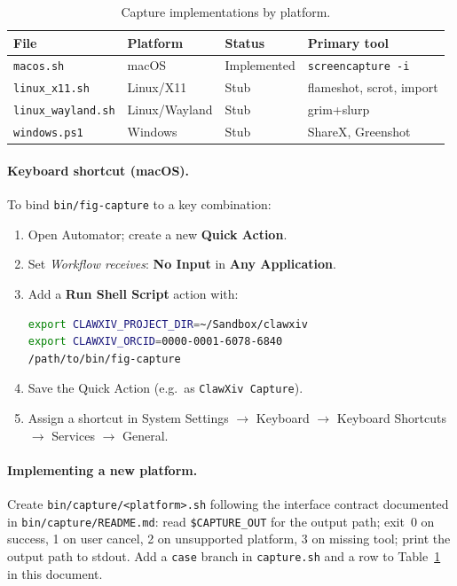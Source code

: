 \documentclass[11pt]{article}
\begin{document}
\begin{table}[h]
\centering
\begin{tabular}{lllp{5cm}}
\hline
File & Platform & Status & Primary tool \\
\hline
\texttt{macos.sh} & macOS & Implemented & \texttt{screencapture -i} \\
\texttt{linux\_x11.sh} & Linux/X11 & Stub & flameshot, scrot, import \\
\texttt{linux\_wayland.sh} & Linux/Wayland & Stub & grim+slurp \\
\texttt{windows.ps1} & Windows & Stub & ShareX, Greenshot \\
\hline
\end{tabular}
\caption{Capture implementations by platform.}
\label{tab:capture}
\end{table}

\paragraph{Keyboard shortcut (macOS).}
To bind \texttt{bin/fig-capture} to a key combination:
\begin{enumerate}[leftmargin=*,itemsep=0.3em]
\item Open Automator; create a new \textbf{Quick Action}.
\item Set \emph{Workflow receives}: \textbf{No Input}
  in \textbf{Any Application}.
\item Add a \textbf{Run Shell Script} action with:
\begin{lstlisting}[language=bash]
export CLAWXIV_PROJECT_DIR=~/Sandbox/clawxiv
export CLAWXIV_ORCID=0000-0001-6078-6840
/path/to/bin/fig-capture
\end{lstlisting}
\item Save the Quick Action (e.g.\ as \texttt{ClawXiv Capture}).
\item Assign a shortcut in System Settings $\to$ Keyboard $\to$
  Keyboard Shortcuts $\to$ Services $\to$ General.
\end{enumerate}

\paragraph{Implementing a new platform.}
Create \texttt{bin/capture/<platform>.sh} following the interface
contract documented in \texttt{bin/capture/README.md}: read
\texttt{\$CAPTURE\_OUT} for the output path; exit~0 on success,
1 on user cancel, 2 on unsupported platform, 3 on missing tool;
print the output path to stdout.
Add a \texttt{case} branch in \texttt{capture.sh} and a row to
Table~\ref{tab:capture} in this document.
\end{document}
